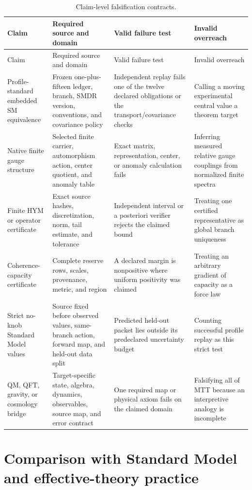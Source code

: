\documentclass[11pt]{article}
\begin{document}
\begin{longtable}{@{}p{2.9cm}p{3.8cm}p{4.1cm}p{3.2cm}@{}}
\caption{Claim-level falsification contracts.}
\label{tab:falsifiers}\\
\toprule
Claim & Required source and domain & Valid failure test & Invalid overreach \\
\midrule
\endfirsthead
\toprule
Claim & Required source and domain & Valid failure test & Invalid overreach \\
\midrule
\endhead
Profile-standard embedded SM equivalence &
Frozen one-plus-fifteen ledger, branch, SMDR version, conventions, and
covariance policy &
Independent replay fails one of the twelve declared obligations or the
transport/covariance checks &
Calling a moving experimental central value a theorem target \\
\addlinespace
Native finite gauge structure &
Selected finite carrier, automorphism action, center quotient, and anomaly
table &
Exact matrix, representation, center, or anomaly calculation fails &
Inferring measured relative gauge couplings from normalized finite spectra \\
\addlinespace
Finite HYM or operator certificate &
Exact source hashes, discretization, norm, tail estimate, and tolerance &
Independent interval or a posteriori verifier rejects the claimed bound &
Treating one certified representative as global branch uniqueness \\
\addlinespace
Coherence-capacity certificate &
Complete reserve rows, scales, provenance, metric, and region &
A declared margin is nonpositive where uniform positivity was claimed &
Treating an arbitrary gradient of capacity as a force law \\
\addlinespace
Strict no-knob Standard Model values &
Source fixed before observed values, same-branch action, forward map, and
held-out data split &
Predicted held-out packet lies outside its predeclared uncertainty budget &
Counting successful profile replay as this strict test \\
\addlinespace
QM, QFT, gravity, or cosmology bridge &
Target-specific state, algebra, dynamics, observables, source map, and error
contract &
One required map or physical axiom fails on the claimed domain &
Falsifying all of MTT because an interpretive analogy is incomplete \\
\bottomrule
\end{longtable}

\section{Comparison with Standard Model and effective-theory practice}
\end{document}
